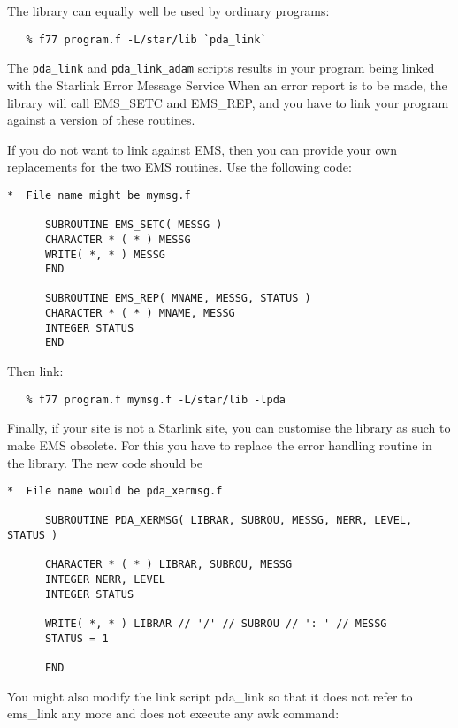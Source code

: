    The library can equally well be used by ordinary programs:

\begin{verbatim}
   % f77 program.f -L/star/lib `pda_link`
\end{verbatim}

   The {\tt pda\_link} and {\tt pda\_link\_adam} scripts results in your 
   program being linked with the Starlink Error Message Service
   When an error report is to
   be made, the library will call EMS\_SETC and EMS\_REP, and you have to
   link your program against a version of these routines.

   If you do not want to link against EMS, then you can provide your own
   replacements for the two EMS routines. Use the following code:

\begin{verbatim}
*  File name might be mymsg.f

      SUBROUTINE EMS_SETC( MESSG )
      CHARACTER * ( * ) MESSG
      WRITE( *, * ) MESSG
      END

      SUBROUTINE EMS_REP( MNAME, MESSG, STATUS )
      CHARACTER * ( * ) MNAME, MESSG
      INTEGER STATUS
      END
\end{verbatim}

   Then link:

\begin{verbatim}
   % f77 program.f mymsg.f -L/star/lib -lpda
\end{verbatim}

   Finally, if your site is not a Starlink site, you can
   customise the library as such to make EMS obsolete. For this you have
   to replace the error handling routine
   in the library. The new code should be

\begin{verbatim}
*  File name would be pda_xermsg.f

      SUBROUTINE PDA_XERMSG( LIBRAR, SUBROU, MESSG, NERR, LEVEL, STATUS )

      CHARACTER * ( * ) LIBRAR, SUBROU, MESSG
      INTEGER NERR, LEVEL
      INTEGER STATUS

      WRITE( *, * ) LIBRAR // '/' // SUBROU // ': ' // MESSG
      STATUS = 1

      END
\end{verbatim}

   You might also modify the link script pda\_link so that it does not
   refer to ems\_link any more and does not execute any awk command:

